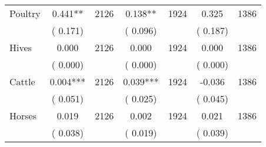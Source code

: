 \begin{tabular}{l*{6}{c}}
Poultry        &              0.441**      &       2126       &              0.138**      &       1924       &              0.325      &       1386       \\
                       &       (       0.171)            &                               &       (       0.096)            &                               &       (       0.187)            &                               \\
Hives        &              0.000      &       2126       &              0.000      &       1924       &              0.000      &       1386       \\
                       &       (       0.000)            &                               &       (       0.000)            &                               &       (       0.000)            &                               \\
Cattle        &              0.004***      &       2126       &              0.039***      &       1924       &             -0.036      &       1386       \\
                       &       (       0.051)            &                               &       (       0.025)            &                               &       (       0.045)            &                               \\
Horses        &              0.019      &       2126       &              0.002      &       1924       &              0.021      &       1386       \\
                       &       (       0.038)            &                               &       (       0.019)            &                               &       (       0.039)            &                               \\
\hline \end{tabular}